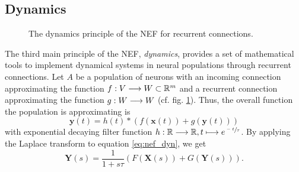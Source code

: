 \subsection{Dynamics}

\begin{figure}[t]
	\centering
{}
\caption{The dynamics principle of the \ac{NEF} for recurrent connections. }
\label{fig:nef_dynamics}
\end{figure}
The third main principle of the \ac{NEF}, \emph{dynamics}, provides a set of mathematical tools to implement dynamical systems in neural populations through recurrent connections.
Let $A$ be a population of neurons with an incoming connection approximating the function $f: V \longrightarrow W \subset \mathbb{R}^{m}$ and a recurrent connection approximating the function $g: W \longrightarrow W$ (cf. fig. \ref{fig:nef_dynamics}).
Thus, the overall function the population is approximating is 
\begin{equation}
\mathbf{y}(t) = h(t) \ast \left(f(\mathbf{x}(t)) + g(\mathbf{y}(t))\right)
\label{eq:nef_dyn}
\end{equation}
with exponential decaying filter function $h: \mathbb{R} \longrightarrow \mathbb{R}, t \longmapsto e^{\sfrac{-t}{\tau}}$.
By applying the Laplace transform to equation \ref{eq:nef_dyn}, we get
\begin{equation}
\label{eq:nef_dyn_laplace}
\mathbf{Y}(s) = \frac{1}{1 + s\tau}\left(F(\mathbf{X}(s)) + G(\mathbf{Y}(s))\right).
\end{equation}
